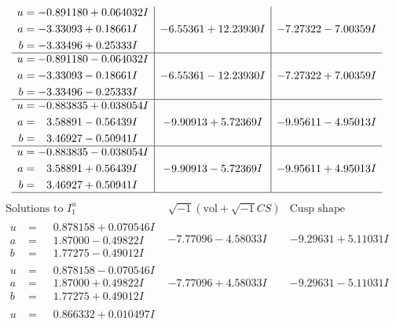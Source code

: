 \documentclass[1p]{elsarticle_modified}
\theoremstyle{definition}
\newcommand{\I}{\sqrt{-1}}
\begin{document}
$$\begin{array}{c|c|c}
\begin{aligned}
u &= -0.891180 + 0.064032 I \\
a &= -3.33093 + 0.18661 I \\
b &= -3.33496 + 0.25333 I\end{aligned}
 & -6.55361 + 12.23930 I & -7.27322 - 7.00359 I \\ \hline\begin{aligned}
u &= -0.891180 - 0.064032 I \\
a &= -3.33093 - 0.18661 I \\
b &= -3.33496 - 0.25333 I\end{aligned}
 & -6.55361 - 12.23930 I & -7.27322 + 7.00359 I \\ \hline\begin{aligned}
u &= -0.883835 + 0.038054 I \\
a &= \phantom{-}3.58891 - 0.56439 I \\
b &= \phantom{-}3.46927 - 0.50941 I\end{aligned}
 & -9.90913 + 5.72369 I & -9.95611 - 4.95013 I \\ \hline\begin{aligned}
u &= -0.883835 - 0.038054 I \\
a &= \phantom{-}3.58891 + 0.56439 I \\
b &= \phantom{-}3.46927 + 0.50941 I\end{aligned}
 & -9.90913 - 5.72369 I & -9.95611 + 4.95013 I\\
 \hline 
 \end{array}$$\newpage$$\begin{array}{c|c|c}  
\text{Solutions to }I^u_{1}& \I (\text{vol} + \sqrt{-1}CS) & \text{Cusp shape}\\
 \hline 
\begin{aligned}
u &= \phantom{-}0.878158 + 0.070546 I \\
a &= \phantom{-}1.87000 - 0.49822 I \\
b &= \phantom{-}1.77275 - 0.49012 I\end{aligned}
 & -7.77096 - 4.58033 I & -9.29631 + 5.11031 I \\ \hline\begin{aligned}
u &= \phantom{-}0.878158 - 0.070546 I \\
a &= \phantom{-}1.87000 + 0.49822 I \\
b &= \phantom{-}1.77275 + 0.49012 I\end{aligned}
 & -7.77096 + 4.58033 I & -9.29631 - 5.11031 I \\ \hline\begin{aligned}
u &= \phantom{-}0.866332 + 0.010497 I \\

\end{aligned}
\end{array}$$
\end{document}
